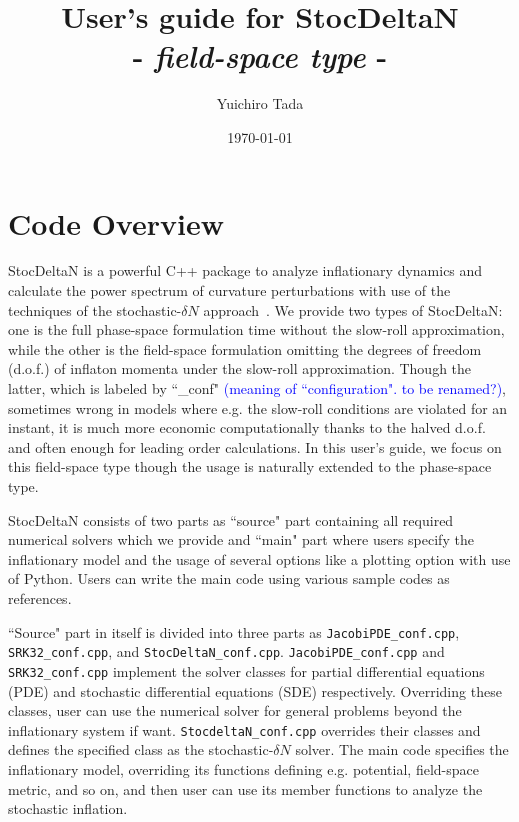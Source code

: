 \documentclass[aps, prd
, preprint
, nofootinbib 
, notitlepage
, longbibliography
]{revtex4-1}
\newcommand{\Blue}[1]{\textcolor{blue}{\sffamily #1}}
\begin{document}
\title{User's guide for StocDeltaN \\[-10pt] {- \small\textit{field-space type} -}}
\date{\today}

\author{Yuichiro Tada}



\maketitle


\section{Code Overview}

StocDeltaN is a powerful C++ package to analyze inflationary dynamics and calculate the power spectrum of curvature perturbations with use of the techniques of 
the stochastic-$\delta N$ approach~\cite{Fujita:2013cna,Vennin:2015hra}. We provide two types of StocDeltaN: one is the full phase-space formulation time without the slow-roll approximation,
while the other is the field-space formulation omitting the degrees of freedom (d.o.f.) of inflaton momenta under the slow-roll approximation.
Though the latter, which is labeled by ``\_conf" \Blue{(meaning of ``configuration". to be renamed?)}, sometimes wrong in models where e.g. the slow-roll conditions are violated for an instant,
it is much more economic computationally thanks to the halved d.o.f. and often enough for leading order calculations.
In this user's guide, we focus on this field-space type though the usage is naturally extended to the phase-space type.

StocDeltaN consists of two parts as ``source" part containing all required numerical solvers which we provide and ``main" part where users specify the inflationary model
and the usage of several options like a plotting option with use of Python. Users can write the main code using various sample codes as references.

\newpage

``Source" part in itself is divided into three parts as \texttt{JacobiPDE\_conf.cpp}, \texttt{SRK32\_conf.cpp}, and \texttt{StocDeltaN\_conf.cpp}.
\texttt{JacobiPDE\_conf.cpp} and \texttt{SRK32\_conf.cpp} implement the solver classes for partial differential equations (PDE) and stochastic differential equations (SDE) respectively.
Overriding these classes, user can use the numerical solver for general problems beyond the inflationary system if want.
\texttt{StocdeltaN\_conf.cpp} overrides their classes and defines the specified class as the stochastic-$\delta N$ solver.
The main code specifies the inflationary model, overriding its functions defining e.g. potential, field-space metric, and so on,
and then user can use its member functions to analyze the stochastic inflation.
\end{document}
